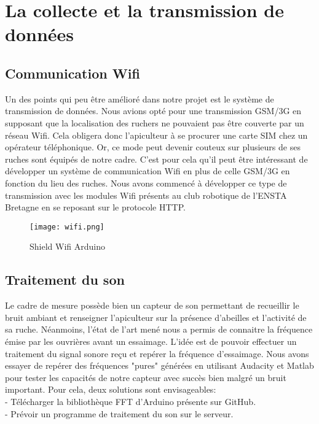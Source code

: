 \chapter{La collecte et la transmission de données}

\section{Communication Wifi}

Un des points qui peu être amélioré dans notre projet est le système de transmission de données. Nous avions opté pour une transmission GSM/3G en supposant que la localisation des ruchers ne pouvaient pas être couverte par un réseau Wifi. Cela obligera donc l'apiculteur à se procurer une carte SIM chez un opérateur téléphonique. Or, ce mode peut devenir couteux sur plusieurs de ses ruches sont équipés de notre cadre. C'est pour cela qu'il peut être intéressant de développer un système de communication Wifi en plus de celle GSM/3G en fonction du lieu des ruches. Nous avons commencé à développer ce type de transmission avec les modules Wifi présents au club robotique de l'ENSTA Bretagne en se reposant sur le protocole HTTP.   

\begin{figure}[h!]
\centering\texttt{[image: wifi.png]}
\caption{\label{fig:wifi} Shield Wifi Arduino}
\end{figure}

\clearpage

\section{Traitement du son}

Le cadre de mesure possède bien un capteur de son permettant de recueillir le bruit ambiant et renseigner l'apiculteur sur la présence d'abeilles et l'activité de sa ruche. Néanmoins, l'état de l'art mené nous a permis de connaitre la fréquence émise par les ouvrières avant un essaimage. L'idée est de pouvoir effectuer un traitement du signal sonore reçu et repérer la fréquence d'essaimage. Nous avons essayer de repérer des fréquences "pures" générées en utilisant Audacity et Matlab pour tester les capacités de notre capteur avec succès bien malgré un bruit important.
Pour cela, deux solutions sont envisageables: \\

\indent - Télécharger la bibliothèque FFT d'Arduino présente sur GitHub. \\
\indent - Prévoir un programme de traitement du son sur le serveur. \\

